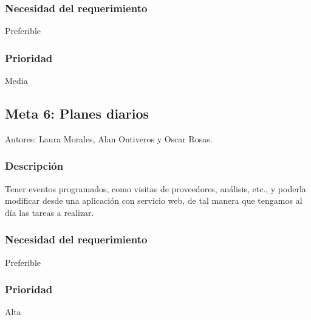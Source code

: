 \documentclass[12pt, fleqn]{report}                             %
\theoremstyle{break}                                            %
\begin{document}
    \subsubsection{Necesidad del requerimiento}
    Preferible
    \subsubsection{Prioridad}
    Media
    
    \subsection{Meta 6: Planes diarios}
    Autores: Laura Morales, Alan Ontiveros y Oscar Rosas.
    
   \subsubsection{Descripción}
   Tener eventos programados, como visitas de proveedores, análisis, etc., y poderla modificar desde una aplicación con servicio web, de tal manera que tengamos al día las tareas a realizar.
    \subsubsection{Necesidad del requerimiento}
    Preferible
    \subsubsection{Prioridad}
    Alta
    
    
    
    
\end{document}
